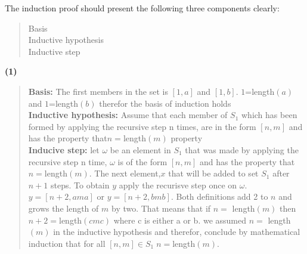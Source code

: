 \documentclass[12pt]{article}
\begin{document}
The induction proof should present the following three components clearly:
  \begin{quote}
    Basis \\
    Inductive hypothesis \\
    Inductive step
  \end{quote}
{\bf(1)}
\begin{quote}
 {\bfseries {Basis:}}
 The first members in the set is $[1,a]$ and $[1,b]$.  $1$=length$(a)$ and $1$=length$(b)$ therefor the basis of induction holds\\
 {\bfseries {Inductive hypothesis:}} Assume that each member of $S_1$ which has been formed by applying the recursive step n times, are in the form $[n,m] $ and has the property that$  n=$length$(m)$ property \\
{\bfseries Inducive step:}
let $\omega$ be an element in $S_1$  that was made by applying the recursive step n time, $\omega$ is of the form $[n,m] $ and has the property that  $ n = $length$(m)$. The next element,$x$ that will be added to set $S_1$ after $n+1$ steps. To obtain $y$ apply the recurisve step once on $\omega$. $y= [n+2,ama]$ or $y= [n+2,bmb]$. Both definitions add 2 to $n$ and grows the length of $m$ by two. That means that if $n =$ length$(m)$ then $n+2 = $length$(cmc)$ where c is either a or b. we assumed  $n =$ length$(m)$ in the inductive hypothesis and therefor, conclude by mathematical induction that for all $[n,m] \in S_1 \; n= $length$(m)$.
\end{quote}
\end{document}
